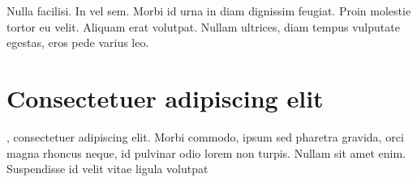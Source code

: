 \begin{savequote}[75mm]
Nulla facilisi. In vel sem. Morbi id urna in diam dignissim feugiat. Proin molestie tortor eu velit. Aliquam erat volutpat. Nullam ultrices, diam tempus vulputate egestas, eros pede varius leo.
\end{savequote}

\chapter{Consectetuer adipiscing elit}

, consectetuer adipiscing elit. Morbi commodo, ipsum sed pharetra gravida, orci
magna rhoncus neque, id pulvinar odio lorem non turpis. Nullam sit amet enim. Suspendisse id velit vitae ligula volutpat

